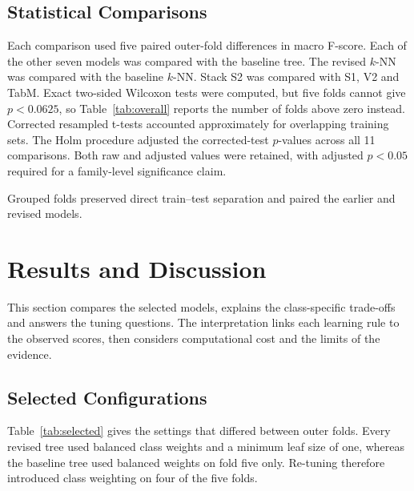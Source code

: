 \documentclass[conference]{IEEEtran}
\newcommand{\knn}{\mbox{$k$-NN}}
\begin{document}
\subsection{Statistical Comparisons}
Each comparison used five paired outer-fold differences in macro F-score. Each of the other seven models was compared with the baseline tree. The revised \knn{} was compared with the baseline \knn{}. Stack S2 was compared with S1, V2 and TabM. Exact two-sided Wilcoxon tests were computed, but five folds cannot give $p<0.0625$, so Table~\ref{tab:overall} reports the number of folds above zero instead. Corrected resampled t-tests accounted approximately for overlapping training sets. The Holm procedure adjusted the corrected-test $p$-values across all 11 comparisons. Both raw and adjusted values were retained, with adjusted $p<0.05$ required for a family-level significance claim.

Grouped folds preserved direct train--test separation and paired the earlier and revised models.

\section{Results and Discussion}
This section compares the selected models, explains the class-specific trade-offs and answers the tuning questions. The interpretation links each learning rule to the observed scores, then considers computational cost and the limits of the evidence.

\subsection{Selected Configurations}
Table~\ref{tab:selected} gives the settings that differed between outer folds. Every revised tree used balanced class weights and a minimum leaf size of one, whereas the baseline tree used balanced weights on fold five only. Re-tuning therefore introduced class weighting on four of the five folds.
\end{document}
